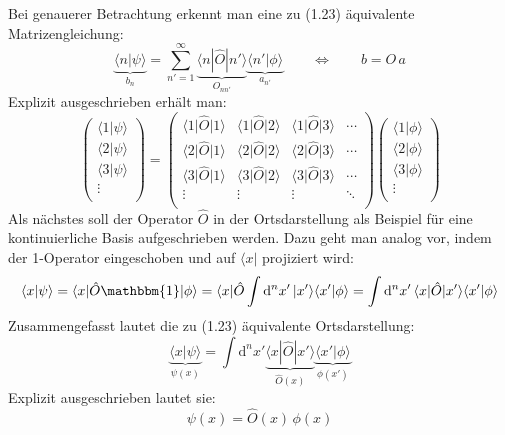 \documentclass[9pt]{report}
\begin{document}
Bei genauerer Betrachtung erkennt man eine zu (1.23) äquivalente Matrizengleichung:
\begin{equation}
\underbrace{\langle n|\psi\rangle}_{b_n}=\sum_{n'=1}^{\infty}\underbrace{\langle n|\hat{O}|n'\rangle}_{O_{nn'}}\underbrace{\langle n'|\phi\rangle}_{a_{n'}}\qquad\Leftrightarrow\qquad b=O\,a
\end{equation}
Explizit ausgeschrieben erhält man:
\begin{equation}
\renewcommand{\arraystretch}{1.4}
\left(\begin{array}{c}\big\langle 1\big|\psi\big\rangle \\ \big\langle 2\big|\psi\big\rangle \\ \big\langle 3\big|\psi\big\rangle \\ \vdots \\\end{array}\right)=
\left(\begin{array}{cccc}
\big\langle 1\big|\hat{O}\big|1\big\rangle &
\big\langle 1\big|\hat{O}\big|2\big\rangle &
\big\langle 1\big|\hat{O}\big|3\big\rangle &
\cdots\\
\big\langle 2\big|\hat{O}\big|1\big\rangle & 
\big\langle 2\big|\hat{O}\big|2\big\rangle & 
\big\langle 2\big|\hat{O}\big|3\big\rangle &
\cdots\\
\big\langle 3\big|\hat{O}\big|1\big\rangle & 
\big\langle 3\big|\hat{O}\big|2\big\rangle & 
\big\langle 3\big|\hat{O}\big|3\big\rangle &
\cdots\\
\vdots &
\vdots &
\vdots  &
\ddots \\\end{array}\right)
\left(\begin{array}{c} \big\langle 1\big|\phi\big\rangle \\ \big\langle 2\big|\phi\big\rangle \\ \big\langle 3\big|\phi\big\rangle \\ \vdots \\\end{array}\right)
\end{equation}
Als nächstes soll der Operator $\hat{O}$ in der Ortsdarstellung als Beispiel für eine kontinuierliche Basis aufgeschrieben werden. Dazu geht man analog vor, indem der 1-Operator eingeschoben und auf $\langle x|$ projiziert wird:
\begin{equation}
\langle x|\psi\rangle=\langle x|\hat{O}\mathbbm{1}|\phi\rangle=\langle x|\hat{O}\int\mathrm{d}^{n}x'\,|x'\rangle\langle x'|\phi\rangle=\int\mathrm{d}^{n}x'\,\langle x|\hat{O}|x'\rangle\langle x'|\phi\rangle
\end{equation}
Zusammengefasst lautet die zu (1.23) äquivalente Ortsdarstellung:
\begin{equation}
\underbrace{\langle x|\psi\rangle}_{\psi(x)}=\int\mathrm{d}^{n}x'\underbrace{\langle x|\hat{O}|x'\rangle}_{\hat{O}(x)}\underbrace{\langle x'|\phi\rangle}_{\phi(x')}
\end{equation}
Explizit ausgeschrieben lautet sie:
\begin{equation}
\psi(x)=\hat{O}(x)\,\phi(x)
\end{equation}
\end{document}
